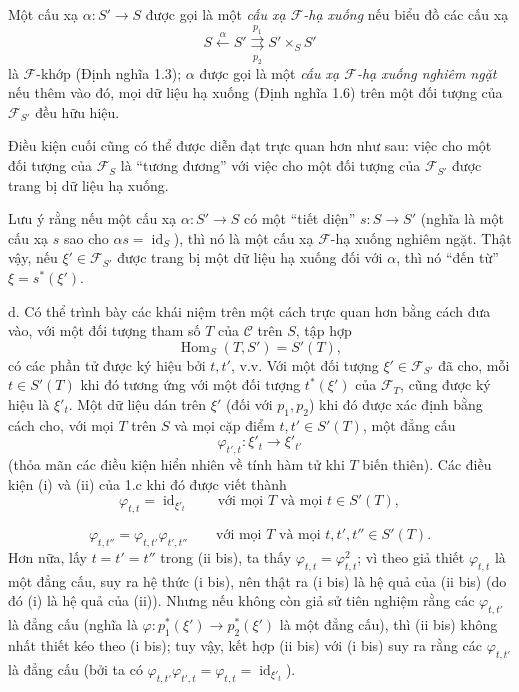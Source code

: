  Một cấu xạ $\alpha:S'\longrightarrow S$ được gọi là
một \emph{cấu xạ $\mathcal F$-hạ xuống} nếu biểu đồ các cấu xạ
\[
  S\xleftarrow{\alpha}S'
  \overset{p_1}{\underset{p_2}{\rightrightarrows}}S'\times_S S'
\]
là $\mathcal F$-khớp (Định nghĩa 1.3); $\alpha$ được gọi là một
\emph{cấu xạ $\mathcal F$-hạ xuống nghiêm ngặt} nếu thêm vào đó, mọi dữ liệu hạ
xuống (Định nghĩa 1.6) trên một đối tượng của $\mathcal F_{S'}$ đều hữu hiệu.

Điều kiện cuối cũng có thể được diễn đạt trực quan hơn như sau: việc cho một
đối tượng của $\mathcal F_S$ là ``tương đương'' với việc cho một đối tượng của
$\mathcal F_{S'}$ được trang bị dữ liệu hạ xuống.

Lưu ý rằng nếu một cấu xạ $\alpha:S'\longrightarrow S$ có một ``tiết diện''
$s:S\longrightarrow S'$ (nghĩa là một cấu xạ $s$ sao cho
$\alpha s=\operatorname{id}_S$), thì nó là một cấu xạ
$\mathcal F$-hạ xuống nghiêm ngặt. Thật vậy, nếu
$\xi'\in\mathcal F_{S'}$ được trang bị một dữ liệu hạ xuống đối với $\alpha$,
thì nó ``đến từ'' $\xi=s^*(\xi')$.

\medskip\noindent
d. Có thể trình bày các khái niệm trên một cách trực quan hơn bằng cách đưa vào,
với một đối tượng tham số $T$ của $\mathcal C$ trên $S$, tập hợp
\[
  \operatorname{Hom}_S(T,S')=S'(T),
\]
có các phần tử được ký hiệu bởi $t,t'$, v.v. Với một đối tượng
$\xi'\in\mathcal F_{S'}$ đã cho, mỗi $t\in S'(T)$ khi đó tương ứng với một đối
tượng $t^*(\xi')$ của $\mathcal F_T$, cũng được ký hiệu là $\xi'_t$. Một dữ
liệu dán trên $\xi'$ (đối với $p_1,p_2$) khi đó được xác định bằng cách cho,
với mọi $T$ trên $S$ và mọi cặp điểm $t,t'\in S'(T)$, một đẳng cấu
\[
  \varphi_{t',t}:\xi'_t\longrightarrow\xi'_{t'}
\]
(thỏa mãn các điều kiện hiển nhiên về tính hàm tử khi $T$ biến thiên). Các điều
kiện (i) và (ii) của 1.c khi đó được viết thành
\[
  \tag{i bis}
  \varphi_{t,t}=\operatorname{id}_{\xi'_t}
  \qquad\text{với mọi $T$ và mọi $t\in S'(T)$},
\]

\[
  \tag{ii bis}
  \varphi_{t,t''}=\varphi_{t,t'}\varphi_{t',t''}
  \qquad\text{với mọi $T$ và mọi $t,t',t''\in S'(T)$}.
\]
Hơn nữa, lấy $t=t'=t''$ trong (ii bis), ta thấy
$\varphi_{t,t}=\varphi_{t,t}^2$; vì theo giả thiết $\varphi_{t,t}$ là một đẳng
cấu, suy ra hệ thức (i bis), nên thật ra (i bis) là hệ quả của (ii bis) (do đó
(i) là hệ quả của (ii)). Nhưng nếu không còn giả sử tiên nghiệm rằng các
$\varphi_{t,t'}$ là đẳng cấu (nghĩa là
$\varphi:p_1^*(\xi')\longrightarrow p_2^*(\xi')$ là một đẳng cấu), thì (ii bis)
không nhất thiết kéo theo (i bis); tuy vậy, kết hợp (ii bis) với (i bis) suy ra
rằng các $\varphi_{t,t'}$ là đẳng cấu (bởi ta có
$\varphi_{t,t'}\varphi_{t',t}=\varphi_{t,t}=\operatorname{id}_{\xi'_t}$).

